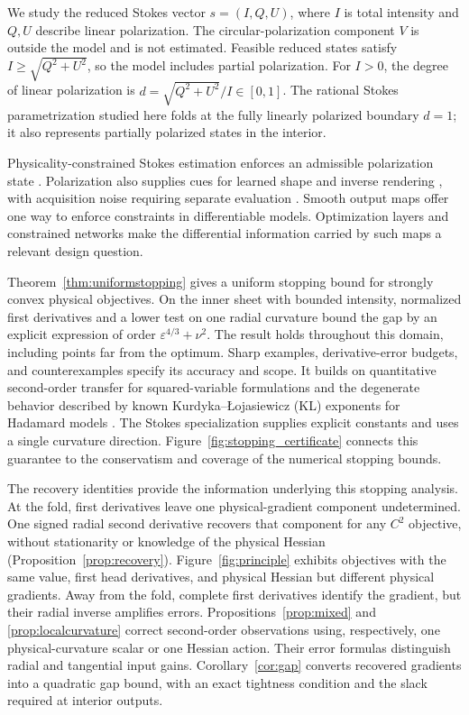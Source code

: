 \documentclass[pdflatex,sn-mathphys-num]{sn-jnl}
\begin{document}
We study the reduced Stokes vector $s=(I,Q,U)$, where $I$ is total intensity and $Q,U$ describe linear polarization. The circular-polarization component $V$ is outside the model and is not estimated. Feasible reduced states satisfy $I\geq\sqrt{Q^2+U^2}$, so the model includes partial polarization. For $I>0$, the degree of linear polarization is $d=\sqrt{Q^2+U^2}/I\in[0,1]$. The rational Stokes parametrization studied here folds at the fully linearly polarized boundary $d=1$; it also represents partially polarized states in the interior.

Physicality-constrained Stokes estimation enforces an admissible polarization state \cite{hu,spc,psara}. Polarization also supplies cues for learned shape and inverse rendering \cite{ba,pandora}, with acquisition noise requiring separate evaluation \cite{polarns}. Smooth output maps offer one way to enforce constraints in differentiable models. Optimization layers \cite{optnet,cvxlayers} and constrained networks \cite{hardnet} make the differential information carried by such maps a relevant design question.

Theorem~\ref{thm:uniformstopping} gives a uniform stopping bound for strongly convex physical objectives. On the inner sheet with bounded intensity, normalized first derivatives and a lower test on one radial curvature bound the gap by an explicit expression of order $\varepsilon^{4/3}+\nu^2$. The result holds throughout this domain, including points far from the optimum. Sharp examples, derivative-error budgets, and counterexamples specify its accuracy and scope. It builds on quantitative second-order transfer for squared-variable formulations \cite{dingwright} and the degenerate behavior described by known Kurdyka--\L{}ojasiewicz (KL) exponents for Hadamard models \cite{ouyang}. The Stokes specialization supplies explicit constants and uses a single curvature direction. Figure~\ref{fig:stopping_certificate} connects this guarantee to the conservatism and coverage of the numerical stopping bounds.

The recovery identities provide the information underlying this stopping analysis. At the fold, first derivatives leave one physical-gradient component undetermined. One signed radial second derivative recovers that component for any $C^2$ objective, without stationarity or knowledge of the physical Hessian (Proposition~\ref{prop:recovery}). Figure~\ref{fig:principle} exhibits objectives with the same value, first head derivatives, and physical Hessian but different physical gradients. Away from the fold, complete first derivatives identify the gradient, but their radial inverse amplifies errors. Propositions~\ref{prop:mixed} and \ref{prop:localcurvature} correct second-order observations using, respectively, one physical-curvature scalar or one Hessian action. Their error formulas distinguish radial and tangential input gains. Corollary~\ref{cor:gap} converts recovered gradients into a quadratic gap bound, with an exact tightness condition and the slack required at interior outputs.
\end{document}
